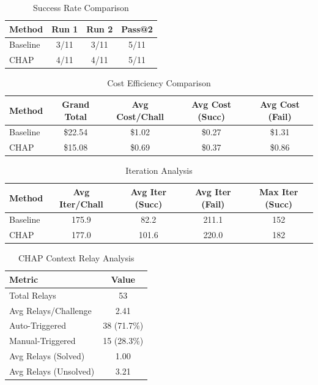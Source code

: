 
\begin{table}[htbp]
\caption{Success Rate Comparison}
\label{tab:success_rate}
\centering
\begin{tabular}{|l|c|c|c|}
\hline
Method & Run 1 & Run 2 & Pass@2 \\
\hline
Baseline & 3/11 & 3/11 & 5/11 \\
CHAP & 4/11 & 4/11 & 5/11 \\
\hline
\end{tabular}
\end{table}

\begin{table}[htbp]
\caption{Cost Efficiency Comparison}
\label{tab:cost}
\centering
\begin{tabular}{|l|c|c|c|c|}
\hline
Method & Grand Total & Avg Cost/Chall & Avg Cost (Succ) & Avg Cost (Fail) \\
\hline
Baseline & \$22.54 & \$1.02 & \$0.27 & \$1.31 \\
CHAP & \$15.08 & \$0.69 & \$0.37 & \$0.86 \\
\hline
\end{tabular}
\end{table}

\begin{table}[htbp]
\caption{Iteration Analysis}
\label{tab:iterations}
\centering
\begin{tabular}{|l|c|c|c|c|}
\hline
Method & Avg Iter/Chall & Avg Iter (Succ) & Avg Iter (Fail) & Max Iter (Succ) \\
\hline
Baseline & 175.9 & 82.2 & 211.1 & 152 \\
CHAP & 177.0 & 101.6 & 220.0 & 182 \\
\hline
\end{tabular}
\end{table}

\begin{table}[htbp]
\caption{CHAP Context Relay Analysis}
\label{tab:relay}
\centering
\begin{tabular}{|l|c|}
\hline
Metric & Value \\
\hline
Total Relays & 53 \\
Avg Relays/Challenge & 2.41 \\
Auto-Triggered & 38 (71.7\%) \\
Manual-Triggered & 15 (28.3\%) \\
Avg Relays (Solved) & 1.00 \\
Avg Relays (Unsolved) & 3.21 \\
\hline
\end{tabular}
\end{table}
